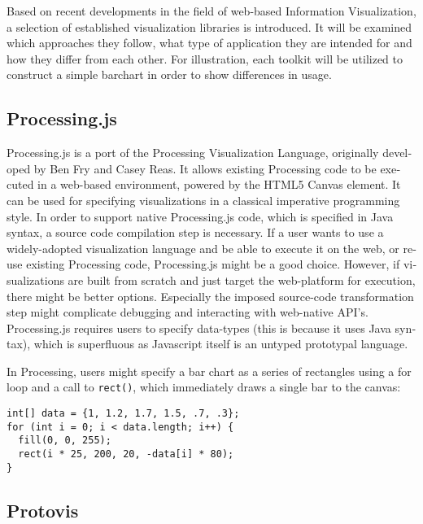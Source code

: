 \begin{english}
Based on recent developments in the field of web-based Information Visualization, a selection of established visualization libraries is introduced. It will be examined which approaches they follow, what type of application they are intended for and how they differ from each other. For illustration, each toolkit will be utilized to construct a simple barchart in order to show differences in usage.


\subsection{Processing.js}

Processing.js is a port of the Processing Visualization Language, originally developed by Ben Fry and Casey Reas. It allows existing Processing code to be executed in a web-based environment, powered by the HTML5 Canvas element. It can be used for specifying visualizations in a classical imperative programming style. In order to support native Processing.js code, which is specified in Java syntax, a source code compilation step is necessary. If a user wants to use a widely-adopted visualization language and be able to execute it on the web, or reuse existing Processing code, Processing.js might be a good choice. However, if visualizations are built from scratch and just target the web-platform for execution, there might be better options. Especially the imposed source-code transformation step might complicate debugging and interacting with web-native API's. Processing.js requires users to specify data-types (this is because it uses Java syntax), which is superfluous as Javascript itself is an untyped prototypal language.

In Processing, users might specify a bar chart as a series of rectangles using a for loop and a call to \texttt{rect()}, which immediately draws a single bar to the canvas:

\begin{verbatim}
int[] data = {1, 1.2, 1.7, 1.5, .7, .3};
for (int i = 0; i < data.length; i++) {
  fill(0, 0, 255);
  rect(i * 25, 200, 20, -data[i] * 80);
}
\end{verbatim}


\subsection{Protovis}


\end{english}
